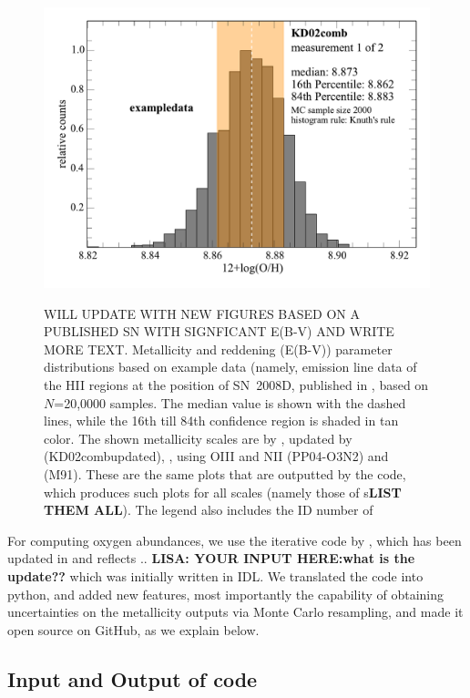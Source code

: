 \documentclass{emulateapj}
\begin{document}
\begin{figure}[!ht]
{\includegraphics[width=1.0\columnwidth]{exampledata_n2000_KD02comb_1.pdf}}
\caption{WILL UPDATE WITH NEW FIGURES BASED ON A PUBLISHED SN WITH SIGNFICANT E(B-V) AND WRITE MORE TEXT. Metallicity and reddening (E(B-V)) parameter distributions based on example data (namely, emission line data of the HII regions at the position of SN~2008D, published in \citet{modjaz11}, based on $N$=20,0000 samples. The median value is shown with the dashed lines, while the 16th till 84th confidence region is shaded in tan color. The shown metallicity scales are  by \citet{kewley02}, updated by \citet{kewley08} (KD02combupdated), \citet{pettini04}, using OIII and NII  (PP04-O3N2) and \citet{mcgaugh91} (M91). These are the same plots that are outputted by the code, which produces such plots for all scales (namely those of s\textbf{LIST THEM ALL}). The legend also includes the ID number of }
 \label{metallicity_distribution}
\end{figure}


For computing oxygen abundances, we use the iterative code by \citet{kewley02}, which has been updated in \citet{kewley08} and reflects .. \textbf{LISA: YOUR INPUT HERE:what is the update??} which was initially written in IDL.  We translated the code into python, and added new features, most importantly the capability of obtaining uncertainties on the metallicity outputs via Monte Carlo resampling, and made it open source on GitHub, as we explain below.


\subsection{Input and Output of code}
\end{document}
